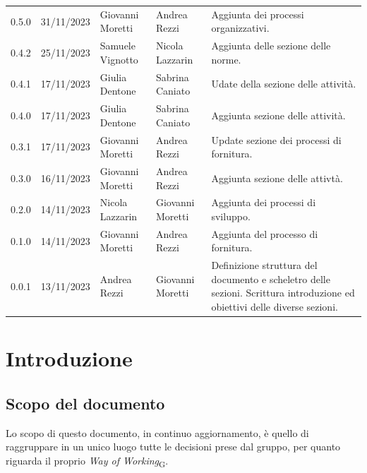 \documentclass{article}
\begin{document}
\begin{center}
\begin{tabular}{P{4em} P{6em} P{8em} P{8em} P{10em}} 
    0.5.0 & 31/11/2023 & Giovanni Moretti & Andrea Rezzi & Aggiunta dei processi organizzativi. \\
    0.4.2 & 25/11/2023 & Samuele Vignotto & Nicola Lazzarin & Aggiunta delle sezione delle norme.\\
    0.4.1 & 17/11/2023 & Giulia Dentone & Sabrina Caniato & Udate della sezione delle attività.\\
    0.4.0 & 17/11/2023 & Giulia Dentone & Sabrina Caniato & Aggiunta sezione delle attività. \\
    0.3.1 & 17/11/2023 & Giovanni Moretti & Andrea Rezzi & Update sezione dei processi di fornitura.\\
    0.3.0 & 16/11/2023 & Giovanni Moretti & Andrea Rezzi & Aggiunta sezione delle attivtà. \\
    0.2.0 & 14/11/2023 & Nicola Lazzarin & Giovanni Moretti & Aggiunta dei processi di sviluppo. \\
    0.1.0 & 14/11/2023 & Giovanni Moretti & Andrea Rezzi & Aggiunta del processo di fornitura.\\
    0.0.1 & 13/11/2023 & Andrea Rezzi & Giovanni Moretti & Definizione struttura del documento e scheletro delle sezioni. Scrittura introduzione ed obiettivi delle diverse sezioni.\\
\end{tabular}
\end{center}
\newpage
\tableofcontents
\newpage

\section{Introduzione}

\subsection{Scopo del documento}
Lo scopo di questo documento, in continuo aggiornamento, è quello di raggruppare in un unico luogo tutte le decisioni prese dal gruppo, per quanto riguarda il proprio \textit{Way of Working}\textsubscript{G}.
\end{document}
